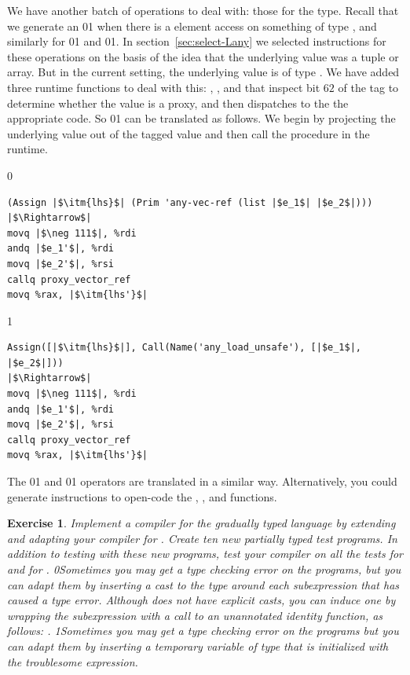 \documentclass[7x10]{TimesAPriori_MIT}%
\def\racketEd{0}
\def\pythonEd{1}
\def\edition{1}
\newcommand{\racket}[1]{{\if\edition\racketEd{#1}\fi}}
\newcommand{\pythonColor}[0]{}
\newcommand{\python}[1]{{\if\edition\pythonEd\pythonColor #1\fi}}
\newtheorem{exercise}[theorem]{Exercise}
\numberwithin{theorem}{chapter}
\numberwithin{definition}{chapter}
\numberwithin{equation}{chapter}
\begin{document}
We have another batch of operations to deal with: those for the
\CANYTY{} type. Recall that we generate an
\racket{}\python{} when
there is a element access on something of type \CANYTY{}, and
similarly for
\racket{}\python{} and
\racket{}\python{}. In
section~\ref{sec:select-Lany} we selected instructions for these
operations on the basis of the idea that the underlying value was a tuple or
array. But in the current setting, the underlying value is of type
\PTUPLETYNAME{}\python{ or \PARRAYTYNAME{}}.  We have added three runtime
functions to deal with this:
,
, and
 that inspect bit $62$ of the tag
to determine whether the value is a proxy, and then
dispatches to the the appropriate code.
%
So \racket{}\python{}
can be translated as follows.
We begin by projecting the underlying value out of the tagged value and
then call the  procedure in the runtime.
{\if\edition\racketEd
\begin{lstlisting}
(Assign |$\itm{lhs}$| (Prim 'any-vec-ref (list |$e_1$| |$e_2$|)))
|$\Rightarrow$|
movq |$\neg 111$|, %rdi
andq |$e_1'$|, %rdi
movq |$e_2'$|, %rsi
callq proxy_vector_ref
movq %rax, |$\itm{lhs'}$|
\end{lstlisting}
\fi}
{\if\edition\pythonEd\pythonColor
\begin{lstlisting}
Assign([|$\itm{lhs}$|], Call(Name('any_load_unsafe'), [|$e_1$|, |$e_2$|]))
|$\Rightarrow$|
movq |$\neg 111$|, %rdi
andq |$e_1'$|, %rdi
movq |$e_2'$|, %rsi
callq proxy_vector_ref
movq %rax, |$\itm{lhs'}$|
\end{lstlisting}
\fi}
\noindent The \racket{}\python{}
and \racket{}\python{} operators 
are translated in a similar way. Alternatively, you could generate
instructions to open-code
the , ,
and  functions.

\begin{exercise}\normalfont\normalsize
  Implement a compiler for the gradually typed \LangGrad{} language by
  extending and adapting your compiler for \LangLam{}. Create ten new
  partially typed test programs. In addition to testing with these
  new programs, test your compiler on all the tests for \LangLam{}
  and for \LangDyn{}.
%
  \racket{Sometimes you may get a type checking error on the
    \LangDyn{} programs, but you can adapt them by inserting a cast to
    the \CANYTY{} type around each subexpression that has caused a type
    error. Although \LangDyn{} does not have explicit casts, you can
    induce one by wrapping the subexpression \code{e} with a call to
    an unannotated identity function, as follows: \code{((lambda (x) x) e)}.}
%
  \python{Sometimes you may get a type checking error on the
    \LangDyn{} programs but you can adapt them by inserting a
    temporary variable of type \CANYTY{} that is initialized with the
    troublesome expression.}
\end{exercise}
\end{document}
